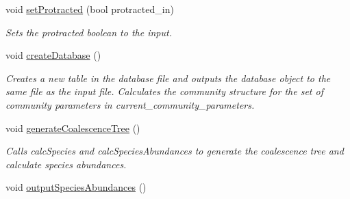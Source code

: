 \begin{DoxyCompactItemize}
\item 
void \hyperlink{group___community_objects_a649afbf07398a1717ad49cb22bb744ff}{set\+Protracted} (bool protracted\+\_\+in)
\begin{DoxyCompactList}\small\item\em Sets the protracted boolean to the input. \end{DoxyCompactList}\item 
void \hyperlink{group___community_objects_ad6e92dafaf00fd65cc29ca436dc61a2e}{create\+Database} ()
\begin{DoxyCompactList}\small\item\em Creates a new table in the database file and outputs the database object to the same file as the input file. Calculates the community structure for the set of community parameters in current\+\_\+community\+\_\+parameters. \end{DoxyCompactList}\item 
void \hyperlink{group___community_objects_a078a9a1210d6b7e8f6f378891f7e8b86}{generate\+Coalescence\+Tree} ()\hypertarget{group___community_objects_a078a9a1210d6b7e8f6f378891f7e8b86}{}\label{group___community_objects_a078a9a1210d6b7e8f6f378891f7e8b86}

\begin{DoxyCompactList}\small\item\em Calls calc\+Species and calc\+Species\+Abundances to generate the coalescence tree and calculate species abundances. \end{DoxyCompactList}\item 
void \hyperlink{group___community_objects_a8cb8044c6b2e290e7933cbc78d7019be}{output\+Species\+Abundances} ()\hypertarget{group___community_objects_a8cb8044c6b2e290e7933cbc78d7019be}{}\label{group___community_objects_a8cb8044c6b2e290e7933cbc78d7019be}


\end{DoxyCompactItemize}
